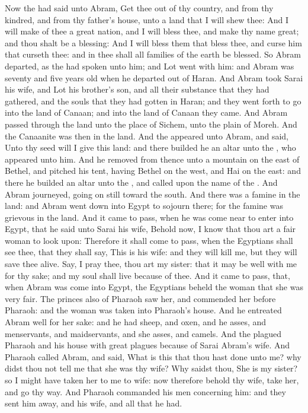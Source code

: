 \begin{biblechapter} %
 Now the \LORD had said unto Abram, Get thee out of thy country, and from thy kindred, and from thy father's house, unto a land that I will shew thee:
\verse And I will make of thee a great nation, and I will bless thee, and make thy name great; and thou shalt be a blessing:
\verse And I will bless them that bless thee, and curse him that curseth thee: and in thee shall all families of the earth be blessed.
\verse So Abram departed, as the \LORD had spoken unto him; and Lot went with him: and Abram was seventy and five years old when he departed out of Haran.
\verse And Abram took Sarai his wife, and Lot his brother's son, and all their substance that they had gathered, and the souls that they had gotten in Haran; and they went forth to go into the land of Canaan; and into the land of Canaan they came.
\verse And Abram passed through the land unto the place of Sichem, unto the plain of Moreh. And the Canaanite was then in the land.
\verse And the \LORD appeared unto Abram, and said, Unto thy seed will I give this land: and there builded he an altar unto the \LORD, who appeared unto him.
\verse And he removed from thence unto a mountain on the east of Bethel, and pitched his tent, having Bethel on the west, and Hai on the east: and there he builded an altar unto the \LORD, and called upon the name of the \LORD.
\verse And Abram journeyed, going on still toward the south.
 And there was a famine in the land: and Abram went down into Egypt to sojourn there; for the famine was grievous in the land.
\verse And it came to pass, when he was come near to enter into Egypt, that he said unto Sarai his wife, Behold now, I know that thou art a fair woman to look upon:
\verse Therefore it shall come to pass, when the Egyptians shall see thee, that they shall say, This is his wife: and they will kill me, but they will save thee alive.
\verse Say, I pray thee, thou art my sister: that it may be well with me for thy sake; and my soul shall live because of thee.
\verse And it came to pass, that, when Abram was come into Egypt, the Egyptians beheld the woman that she was very fair.
\verse The princes also of Pharaoh saw her, and commended her before Pharaoh: and the woman was taken into Pharaoh's house.
\verse And he entreated Abram well for her sake: and he had sheep, and oxen, and he asses, and menservants, and maidservants, and she asses, and camels.
\verse And the \LORD plagued Pharaoh and his house with great plagues because of Sarai Abram's wife.
\verse And Pharaoh called Abram, and said, What is this that thou hast done unto me? why didst thou not tell me that she was thy wife?
\verse Why saidst thou, She is my sister? so I might have taken her to me to wife: now therefore behold thy wife, take her, and go thy way.
\verse And Pharaoh commanded his men concerning him: and they sent him away, and his wife, and all that he had.
\end{biblechapter}


